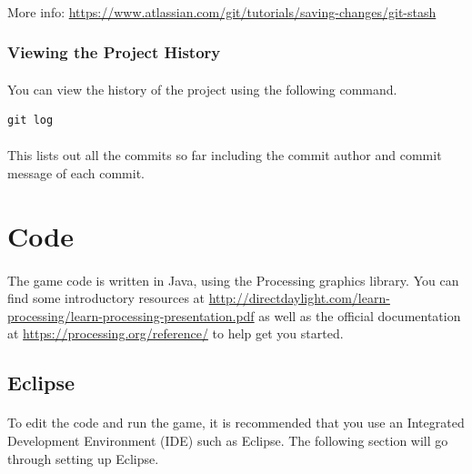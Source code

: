\documentclass[11pt]{article}
\begin{document}
\paragraph{}
More info: \url{https://www.atlassian.com/git/tutorials/saving-changes/git-stash}
\subsubsection{Viewing the Project History}
\paragraph{}
You can view the history of the project using the following command.
\begin{lstlisting}
git log
\end{lstlisting}
\paragraph{}
This lists out all the commits so far including the commit author and commit message of each commit.
\section{Code}
\paragraph{}
The game code is written in Java, using the Processing graphics library. You can find some introductory resources at \url{http://directdaylight.com/learn-processing/learn-processing-presentation.pdf} as well as the official documentation at \url{https://processing.org/reference/} to help get you started.
\subsection{Eclipse}
\paragraph{}
To edit the code and run the game, it is recommended that you use an Integrated Development Environment (IDE) such as Eclipse. The following section will go through setting up Eclipse.
\end{document}
